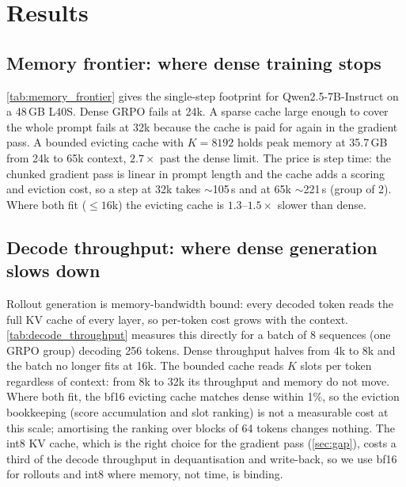 \section{Results}
\label{sec:results}

\subsection{Memory frontier: where dense training stops}
\label{sec:memory}



\cref{tab:memory_frontier} gives the single-step footprint for
Qwen2.5-7B-Instruct on a 48\,GB L40S. Dense GRPO fails at 24k. A sparse cache
large enough to cover the whole prompt fails at 32k because the cache is paid
for again in the gradient pass. A bounded evicting cache with $K=8192$ holds
peak memory at 35.7\,GB from 24k to 65k context, $2.7\times$ past the dense
limit. The price is step time: the chunked gradient pass is linear in prompt
length and the cache adds a scoring and eviction cost, so a step at 32k takes
$\sim$105\,s and at 65k $\sim$221\,s (group of 2). Where both fit (${\le}16$k)
the evicting cache is $1.3$--$1.5\times$ slower than dense. 

\subsection{Decode throughput: where dense generation slows down}
\label{sec:decode}



Rollout generation is memory-bandwidth bound: every decoded token reads the
full KV cache of every layer, so per-token cost grows with the context.
\cref{tab:decode_throughput} measures this directly for a batch of 8
sequences (one GRPO group) decoding 256 tokens. Dense throughput halves from
4k to 8k and the batch no longer fits at 16k. The bounded cache reads $K$
slots per token regardless of context: from 8k to 32k its throughput and
memory do not move. Where both fit, the bf16 evicting cache matches dense
within 1\%, so the eviction bookkeeping (score accumulation and slot
ranking) is not a measurable cost at this scale; amortising the ranking
over blocks of 64 tokens changes nothing. The int8 KV cache, which is the
right choice for the gradient pass (\cref{sec:gap}), costs a third of the
decode throughput in dequantisation and write-back, so we use bf16 for
rollouts and int8 where memory, not time, is binding. 


